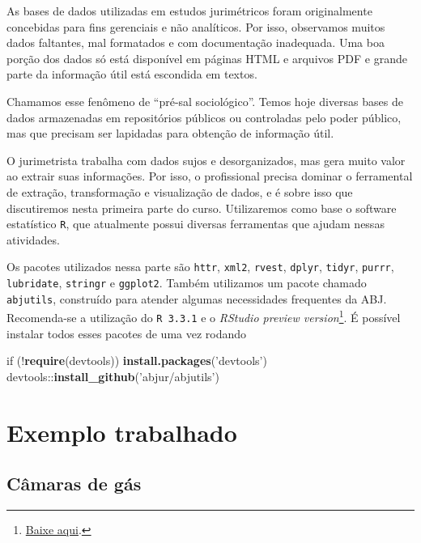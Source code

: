 \documentclass[]{book}
\newenvironment{Shaded}{\begin{snugshade}}{\end{snugshade}}
\newcommand{\KeywordTok}[1]{\textcolor[rgb]{0.13,0.29,0.53}{\textbf{{#1}}}}
\newcommand{\StringTok}[1]{\textcolor[rgb]{0.31,0.60,0.02}{{#1}}}
\newcommand{\NormalTok}[1]{{#1}}
\let\rmarkdownfootnote\footnote%
\def\footnote{\protect\rmarkdownfootnote}
\begin{document}
As bases de dados utilizadas em estudos jurimétricos foram originalmente
concebidas para fins gerenciais e não analíticos. Por isso, observamos
muitos dados faltantes, mal formatados e com documentação inadequada.
Uma boa porção dos dados só está disponível em páginas HTML e arquivos
PDF e grande parte da informação útil está escondida em textos.

Chamamos esse fenômeno de ``pré-sal sociológico''. Temos hoje diversas
bases de dados armazenadas em repositórios públicos ou controladas pelo
poder público, mas que precisam ser lapidadas para obtenção de
informação útil.

O jurimetrista trabalha com dados sujos e desorganizados, mas gera muito
valor ao extrair suas informações. Por isso, o profissional precisa
dominar o ferramental\\
de extração, transformação e visualização de dados, e é sobre isso que
discutiremos nesta primeira parte do curso. Utilizaremos como base o
software estatístico \texttt{R}, que atualmente possui diversas
ferramentas que ajudam nessas atividades.

Os pacotes utilizados nessa parte são \texttt{httr}, \texttt{xml2},
\texttt{rvest}, \texttt{dplyr}, \texttt{tidyr}, \texttt{purrr},
\texttt{lubridate}, \texttt{stringr} e \texttt{ggplot2}. Também
utilizamos um pacote chamado \texttt{abjutils}, construído para atender
algumas necessidades frequentes da ABJ. Recomenda-se a utilização do
\texttt{R\ 3.3.1} e o \emph{RStudio preview version}\footnote{\href{https://www.rstudio.com/products/rstudio/download/preview/}{Baixe
  aqui}.}. É possível instalar todos esses pacotes de uma vez rodando

\begin{Shaded}
\begin{Highlighting}[]
\NormalTok{if (!}\KeywordTok{require}\NormalTok{(devtools)) }\KeywordTok{install.packages}\NormalTok{(}\StringTok{'devtools'}\NormalTok{)}
\NormalTok{devtools::}\KeywordTok{install_github}\NormalTok{(}\StringTok{'abjur/abjutils'}\NormalTok{)}
\end{Highlighting}
\end{Shaded}

\section{Exemplo trabalhado}\label{exemplo-trabalhado}

\subsection{Câmaras de gás}\label{camaras-de-gas}
\end{document}
